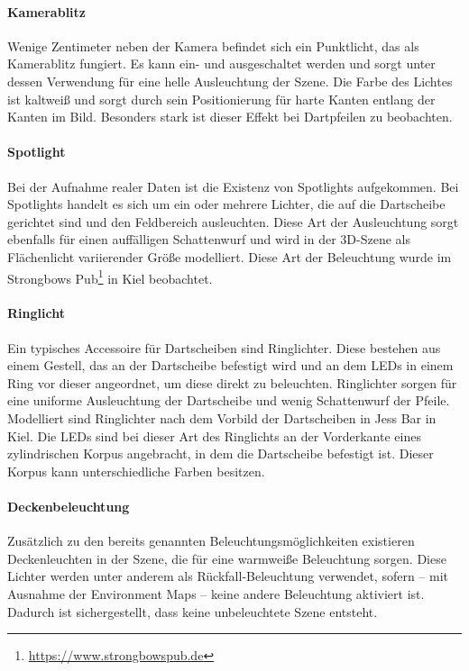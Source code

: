 \paragraph{Kamerablitz}

Wenige Zentimeter neben der Kamera befindet sich ein Punktlicht, das als Kamerablitz fungiert. Es kann ein- und ausgeschaltet werden und sorgt unter dessen Verwendung für eine helle Ausleuchtung der Szene. Die Farbe des Lichtes ist kaltweiß und sorgt durch sein Positionierung für harte Kanten entlang der Kanten im Bild. Besonders stark ist dieser Effekt bei Dartpfeilen zu beobachten.

\paragraph{Spotlight}

Bei der Aufnahme realer Daten ist die Existenz von Spotlights aufgekommen. Bei Spotlights handelt es sich um ein oder mehrere Lichter, die auf die Dartscheibe gerichtet sind und den Feldbereich ausleuchten. Diese Art der Ausleuchtung sorgt ebenfalls für einen auffälligen Schattenwurf und wird in der 3D-Szene als Flächenlicht variierender Größe modelliert. Diese Art der Beleuchtung wurde im Strongbows Pub\footnote{\url{https://www.strongbowspub.de}} in Kiel beobachtet.

\paragraph{Ringlicht}

Ein typisches Accessoire für Dartscheiben sind Ringlichter. Diese bestehen aus einem Gestell, das an der Dartscheibe befestigt wird und an dem LEDs in einem Ring vor dieser angeordnet, um diese direkt zu beleuchten. Ringlichter sorgen für eine uniforme Ausleuchtung der Dartscheibe und wenig Schattenwurf der Pfeile. Modelliert sind Ringlichter nach dem Vorbild der Dartscheiben in Jess Bar in Kiel. Die LEDs sind bei dieser Art des Ringlichts an der Vorderkante eines zylindrischen Korpus angebracht, in dem die Dartscheibe befestigt ist. Dieser Korpus kann unterschiedliche Farben besitzen.

\paragraph{Deckenbeleuchtung}

Zusätzlich zu den bereits genannten Beleuchtungsmöglichkeiten existieren Deckenleuchten in der Szene, die für eine warmweiße Beleuchtung sorgen. Diese Lichter werden unter anderem als Rückfall-Beleuchtung verwendet, sofern -- mit Ausnahme der Environment Maps -- keine andere Beleuchtung aktiviert ist. Dadurch ist sichergestellt, dass keine unbeleuchtete Szene entsteht.

